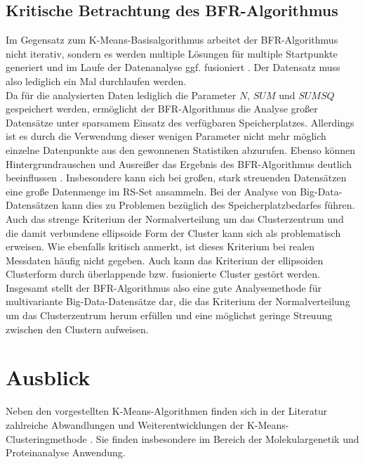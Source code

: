 \documentclass[a4paper,12pt,twoside]{article}
\begin{document}
\subsection{Kritische Betrachtung des BFR-Algorithmus}

Im Gegensatz zum K-Means-Basisalgorithmus arbeitet der BFR-Algorithmus nicht iterativ, sondern es werden multiple Lösungen für multiple Startpunkte generiert und im Laufe der Datenanalyse ggf. fusioniert \citep{bradley1998}. Der Datensatz muss also lediglich ein Mal durchlaufen werden. 
\\

Da für die analysierten Daten lediglich die Parameter $N$, $SUM$ und $SUMSQ$ gespeichert werden, ermöglicht der BFR-Algorithmus die Analyse großer Datensätze unter sparsamem Einsatz des verfügbaren Speicherplatzes. Allerdings ist es durch die Verwendung dieser wenigen Parameter nicht mehr möglich einzelne Datenpunkte aus den gewonnenen Statistiken abzurufen. Ebenso können Hintergrundrauschen und Ausreißer das Ergebnis des BFR-Algorithmus deutlich beeinflussen \citep{kumar}. Insbesondere kann sich bei großen, stark streuenden Datensätzen eine große Datenmenge im RS-Set ansammeln. Bei der Analyse von Big-Data-Datensätzen kann dies zu Problemen bezüglich des Speicherplatzbedarfes führen.
\\

Auch das strenge Kriterium der Normalverteilung um das Clusterzentrum und die damit verbundene ellipsoide Form der Cluster kann sich als problematisch erweisen. Wie \citet{kumar} ebenfalls kritisch anmerkt, ist dieses Kriterium bei realen Messdaten häufig nicht gegeben. Auch kann das Kriterium der ellipsoiden Clusterform durch überlappende bzw. fusionierte Cluster gestört werden.
\\

Insgesamt stellt der BFR-Algorithmus also eine gute Analysemethode für multivariante Big-Data-Datensätze dar, die das Kriterium der Normalverteilung um das Clusterzentrum herum erfüllen und eine möglichst geringe Streuung zwischen den Clustern aufweisen. 

\newpage
\section{Ausblick}

Neben den vorgestellten K-Means-Algorithmen finden sich in der Literatur zahlreiche Abwandlungen und Weiterentwicklungen der K-Means-Clusteringmethode \citep{Bagir2006,wu2008,Aletti2017}. Sie finden insbesondere im Bereich der Molekulargenetik und Proteinanalyse Anwendung. 
\\
\end{document}
